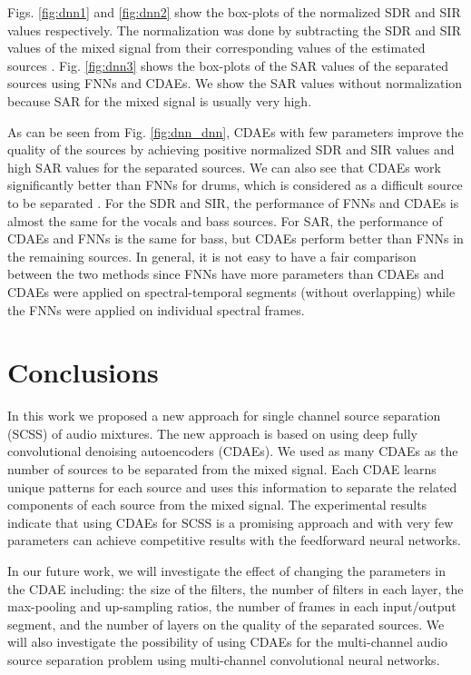 \documentclass{article}
\begin{document}
Figs. \ref{fig:dnn1} and \ref{fig:dnn2} show the box-plots of the normalized SDR and SIR values respectively. The normalization was done by subtracting the SDR and SIR values of the mixed signal from their corresponding values of the estimated sources \cite{alexey:07:aobmfscssaiatvmsips}. Fig. \ref{fig:dnn3} shows the box-plots of the SAR values of the separated sources using FNNs and CDAEs. We show the SAR values without normalization because SAR for the mixed signal is usually very high. 

As can be seen from Fig. \ref{fig:dnn_dnn}, CDAEs with few parameters improve the quality of the sources by achieving positive normalized SDR and SIR values and high SAR values for the separated sources. We can also see that CDAEs work significantly better than FNNs for drums, which is considered as a difficult source to be separated \cite{Stefan:17:imssbdnntdanb,arie:16:masswdnn}. For the SDR and SIR, the performance of FNNs and CDAEs is almost the same for the vocals and bass sources. For SAR, the performance of CDAEs and FNNs is the same for bass, but CDAEs perform better than FNNs in the remaining sources. In general, it is not easy to have a fair comparison between the two methods since FNNs have more parameters than CDAEs and CDAEs were applied on spectral-temporal segments (without overlapping) while the FNNs were applied on individual spectral frames. %

\section{Conclusions}
In this work we proposed a new approach for single channel source separation (SCSS) of audio mixtures. The new approach is based on using deep fully convolutional denoising autoencoders (CDAEs). We used as many CDAEs as the number of sources to be separated from the mixed signal. Each CDAE learns unique patterns for each source and uses this information to separate the related components of each source from the mixed signal. The experimental results indicate that using CDAEs for SCSS is a promising approach and with very few parameters can achieve competitive results with the feedforward neural networks. 

In our future work, we will investigate the effect of changing the parameters in the CDAE including: the size of the filters, the number of filters in each layer, the max-pooling and up-sampling ratios, the number of frames in each input/output segment, and the number of layers on the quality of the separated sources. We will also investigate the possibility of using CDAEs for the multi-channel audio source separation problem using multi-channel convolutional neural networks.     
\end{document}
